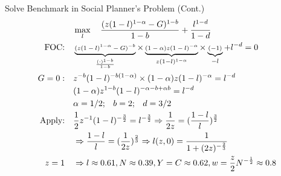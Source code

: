 \documentclass[11pt,aspectratio=169,usenames,dvipsnames]{beamer}
\begin{document}
\begin{frame}{Solve Benchmark in Social Planner's Problem (Cont.)}
\label{slide:Solve_Benchmark_in_Social_Planner_s_Problem__Cont__}
\begin{align}
        & \max_{l} \quad \frac{(z ( 1-l )^{1-\alpha} - G)^{1-b}}{1-b} + \frac{l^{1-d}}{1-d}
    \\
    \text{FOC:} \quad
        & \scriptsize
            \underbrace{( z ( 1-l )^{1-\alpha} - G )^{-b}}_{ \frac{( \cdot )^{1-b}}{1-b}}
            \times \underbrace{( 1-\alpha )z( 1-l )^{-\alpha}}_{ z( 1-l )^{1-\alpha}}
            \times \underbrace{( -1 )}_{-l}
            + l^{-d} = 0
    \\
    G = 0 : \quad
        & \scriptsize
            z^{-b}( 1-l )^{-b(1-\alpha)} \times ( 1-\alpha ) z( 1-l )^{-\alpha} = l^{-d}
    \\
        & \scriptsize
            ( 1-\alpha ) z^{1-b} ( 1-l )^{-\alpha - b+ \alpha b} = l^{-d}
    \\
        & \scriptsize
            \alpha = 1/2; \quad b = 2; \quad d = 3/2
    \\
    \text{Apply:} \quad
        & \scriptsize
            \frac{1}{2} z^{-1} ( 1-l )^{-\frac{3}{2}} = l^{-\frac{3}{2}} \Rightarrow  \frac{1}{2z} = ( \frac{1-l}{l} )^{ \frac{3}{2}}
    \\
        & \scriptsize
            \Rightarrow \frac{1-l}{l} = ( \frac{1}{2z} )^{\frac{2}{3}} \Rightarrow l( z, 0 ) = \frac{1}{1 + (2z)^{-\frac{2}{3}}}
    \\
    z = 1 \quad
        & \scriptsize
            \Rightarrow l \approx 0.61, N \approx 0.39, Y = C \approx 0.62, w = \frac{z}{2} N^{-\frac{1}{2}} \approx 0.8
\end{align}
\end{frame}
\end{document}
